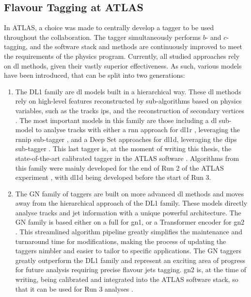 \subsection{Flavour Tagging at ATLAS}
In ATLAS, a choice was made to centrally develop a tagger to be used throughout the collaboration. The tagger simultaneously performs $b$- and $c$-tagging, and the software stack and methods are continuously improved to meet the requirements of the physics program. Currently, all studied approaches rely on \gls{dl} methods, given their vastly superior effectiveness. As such, various models have been introduced, that can be split into two generations: 
\begin{enumerate}
  \item The DL1 family are \gls{dl} models built in a hierarchical way. These \gls{dl} methods rely on high-level features reconstructed by sub-algorithms based on physics variables, such as the tracks \glspl{ip}, and the reconstruction of secondary vertices \cite{ATL-PHYS-PUB-2015-022}. The most important models in this family are those including a \gls{dl} sub-model to analyse tracks with either a \gls{rnn} approach for \gls{dl1r} \cite{ATLAS:2017bcq}, leveraging the \gls{rnnip} sub-tagger \cite{ATL-PHYS-PUB-2017-003}, and a Deep Set approaches for \gls{dl1d}, leveraging the \gls{dips} sub-tagger \cite{ATL-PHYS-PUB-2020-014}. This last tagger is, at the moment of writing this thesis, the state-of-the-art calibrated tagger in the ATLAS software \cite{ATL-SOFT-PUB-2021-001}. Algorithms from this family were mainly developed for the end of Run 2 of the ATLAS experiment \cite{atlas:FTAGRUN2}, with \gls{dl1d} being developed before the start of Run 3.
  \item The GN family of taggers are built on more advanced \gls{dl} methods and moves away from the hierarchical approach of the DL1 family. These models directly analyse tracks and jet information with a unique powerful architecture. The GN family is based either on a full  for \gls{gn1}, or a Transformer encoder for \gls{gn2} \cite{ATL-PHYS-PUB-2022-027, ATL-PLOT-FTAG-2023-01, duperrin2023flavour}. This streamlined algorithm pipeline greatly simplifies the maintenance and turnaround time for modifications, making the process of updating the taggers nimbler and easier to tailor to specific applications. The GN taggers greatly outperform the DL1 family and represent an exciting area of progress for future analysis requiring precise flavour jets tagging. \gls{gn2} is, at the time of writing, being calibrated and integrated into the ATLAS software stack, so that it can be used for Run 3 analyses \cite{ATL-SOFT-PUB-2021-001}.  
\end{enumerate}

